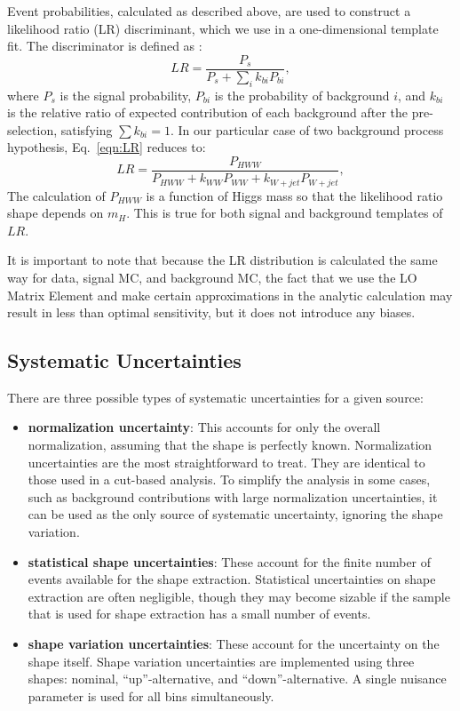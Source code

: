 \documentclass{cmspaper}
\begin{document}
Event probabilities, calculated as described above, are used to construct 
a likelihood ratio (LR) discriminant, which we use in a one-dimensional template fit.  
The discriminator is defined as :
\begin{equation}
\label{eqn:LR}
LR = \frac { P_s} { P_s + \sum_i k_{bi} P_{bi}},
\end{equation}
where $P_s$ is the signal probability, $P_{bi}$ is the probability of background $i$, and 
 $k_{bi}$ is the relative ratio of expected contribution of each background after the pre-selection, satisfying $\sum k_{bi} =1$.
In our particular case of two background process hypothesis, Eq.~\ref{eqn:LR} reduces to:
\begin{equation}
\label{eqn:LRHWW}
LR = \frac { P_{HWW}} { P_{HWW} + k_{WW} P_{WW}+k_{W+jet} P_{W+jet}},
\end{equation}
The calculation of $P_{HWW}$ is a function of Higgs mass so that the likelihood ratio
shape depends on $m_H$. This is true for both signal and background templates of $LR$.

It is important to note that because the LR distribution is calculated the same way for data,
signal MC, and background MC, the fact that we use the LO Matrix Element and make certain 
approximations in the analytic calculation may result in less than optimal sensitivity, but
it does not introduce any biases.
                                        
\subsection{Systematic Uncertainties}
There are three possible types of systematic uncertainties for a 
given source:
\begin{itemize}
  \item {\bf normalization uncertainty}:  This accounts for only the overall normalization,
  assuming that the shape is perfectly known.  Normalization uncertainties are the most 
  straightforward to treat. They are identical to those used in a cut-based analysis. 
  To simplify the analysis in some cases, such as background contributions with large 
  normalization uncertainties, it can be used as the only source of systematic uncertainty,
   ignoring the shape variation.

  \item {\bf statistical shape uncertainties}:  These account for the finite number of events
   available for the shape extraction.  Statistical uncertainties on shape extraction are often negligible,
   though they may become sizable if the sample that is used for shape extraction has a small number
   of events.

  \item {\bf shape variation uncertainties}:  These account for the uncertainty on the shape itself.  
  Shape variation uncertainties are implemented using three shapes: nominal, ``up''-alternative,
   and ``down''-alternative. A single nuisance parameter is used for all bins simultaneously.

\end{itemize}
\end{document}
